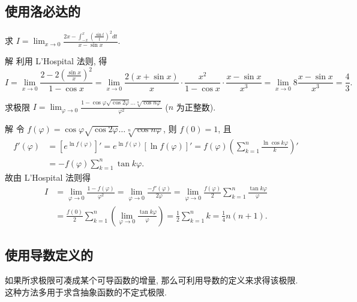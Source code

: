 \documentclass[lang=cn,newtx,10pt,scheme=chinese]{elegantbook}
\begin{document}
\subsection{使用洛必达的}
\begin{example}
  求 $I = \lim_{x \to 0} \frac{2x - \int_{-x}^x \left(\frac{\sin t}{t}\right)^2 dt}{x - \sin x}$.
\end{example}
\begin{solution}
  解 利用 L'Hospital 法则, 得
  $$
  I = \lim_{x \to 0} \frac{2 - 2 \left(\frac{\sin x}{x}\right)^2}{1 - \cos x} = \lim_{x \to 0} \frac{2(x + \sin x)}{x} \cdot \frac{x^2}{1 - \cos x} \cdot \frac{x - \sin x}{x^3} = \lim_{x \to 0} 8 \frac{x - \sin x}{x^3} = \frac{4}{3}.
  $$
\end{solution}
\begin{example}
  求极限 $I = \lim_{\varphi \to 0} \frac{1 - \cos \varphi \sqrt{\cos 2\varphi} \dots \sqrt[n]{\cos n\varphi}}{\varphi^2}$ ($n$ 为正整数).
\end{example}
\begin{solution}
  解 令 $f(\varphi) = \cos \varphi \sqrt{\cos 2\varphi} \dots \sqrt[n]{\cos n\varphi}$, 则 $f(0) = 1$, 且
  $$
  \begin{aligned}
  f'(\varphi) &= [e^{\ln f(\varphi)}]' = e^{\ln f(\varphi)} [\ln f(\varphi)]' = f(\varphi) \left(\sum_{k=1}^n \frac{\ln \cos k\varphi}{k}\right)' \\
  &= -f(\varphi) \sum_{k=1}^n \tan k\varphi.
  \end{aligned}
  $$
  故由 L'Hospital 法则得
  $$
  \begin{aligned}
  I &= \lim_{\varphi \to 0} \frac{1 - f(\varphi)}{\varphi^2} = \lim_{\varphi \to 0} \frac{-f'(\varphi)}{2\varphi} = \lim_{\varphi \to 0} \frac{f(\varphi)}{2} \sum_{k=1}^n \frac{\tan k\varphi}{\varphi} \\
  &= \frac{f(0)}{2} \sum_{k=1}^n \left(\lim_{\varphi \to 0} \frac{\tan k\varphi}{\varphi}\right) = \frac{1}{2} \sum_{k=1}^n k = \frac{1}{4}n(n+1).
  \end{aligned}
  $$
\end{solution}

\subsection{使用导数定义的}
如果所求极限可凑成某个可导函数的增量, 那么可利用导数的定义来求得该极限. 这种方法多用于求含抽象函数的不定式极限.
\end{document}
